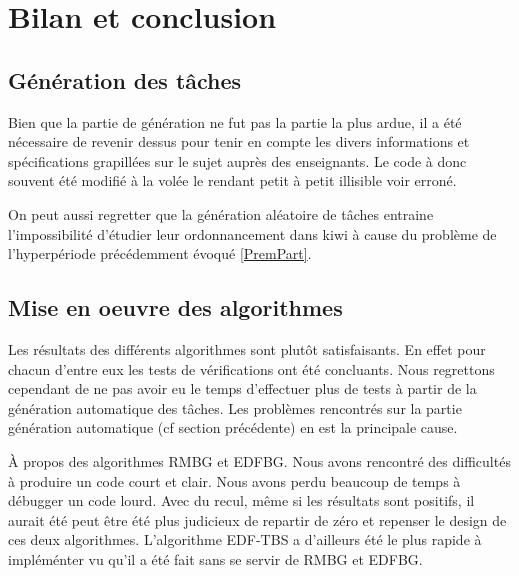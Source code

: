 \chapter{Bilan et conclusion}
\section{Génération des tâches}
Bien que la partie de génération ne fut pas la partie la plus ardue, il a été nécessaire de revenir dessus pour tenir en compte les divers informations et spécifications grapillées sur le sujet auprès des enseignants. Le code à donc souvent été modifié à la volée le rendant petit à petit illisible voir erroné.

On peut aussi regretter que la génération aléatoire de tâches entraine l'impossibilité d'étudier leur ordonnancement dans kiwi à cause du problème de l'hyperpériode précédemment évoqué \ref{PremPart}.


\section{Mise en oeuvre des algorithmes}
Les résultats des différents algorithmes sont plutôt satisfaisants. En effet pour chacun d'entre eux les tests de vérifications ont été concluants. Nous regrettons cependant de ne pas avoir eu le temps d'effectuer plus de tests à partir de la génération automatique des tâches. Les problèmes rencontrés sur la partie génération automatique (cf section précédente) en est la principale cause.

\`A propos des algorithmes RMBG et EDFBG. Nous avons rencontré des difficultés à produire un code court et clair. Nous avons perdu beaucoup de temps à débugger un code lourd. Avec du recul, même si les résultats sont positifs, il aurait été peut être été plus judicieux de repartir de zéro et repenser le design de ces deux algorithmes.  L'algorithme EDF-TBS a d'ailleurs été le plus rapide à impléménter vu qu'il a été fait sans se servir de RMBG et EDFBG.

